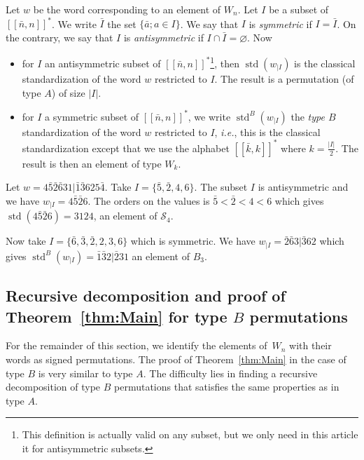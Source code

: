 \documentclass[Unicode]{cedram-alco}
\theoremstyle{definition}
\newcommand{\Sym}[1]{\mathcal{S}_{#1}}
\DeclareMathOperator{\std}{std}
\newcommand{\rest}[2]{#1_{|#2}}
\newcommand{\Bsetnn}{[\![\bar{n},n ]\!]^*}
\newcommand{\Bsetkk}{[\![\bar{k},k ]\!]^*}
\newcommand{\Bstd}{\std^{B}}
\begin{document}
\begin{defi}\label{def:Standard}
Let $w$ be the word corresponding to an element of $W_n$. Let $I$ be a subset of $\Bsetnn$. We write $\bar{I}$ the set $\lbrace \bar a; a \in I \rbrace$. We say that $I$ is \emph{symmetric} if $I = \bar{I}$. On the contrary, we say that $I$ is {\em antisymmetric} if $I \cap \bar{I} = \varnothing$. Now
\begin{itemize}
\item for $I$ an antisymmetric subset of $\Bsetnn$\footnote{This definition is actually valid on any subset, but we only need in this article  it for antisymmetric subsets.}, then $\std(\rest{w}{I})$ is the classical standardization of the word $w$ restricted to $I$. The result is a permutation (of type $A$) of size $|I|$.
\item for $I$ a symmetric subset of $\Bsetnn$, we write $\Bstd(\rest{w}{I})$ the \emph{type $B$} standardization of the word $w$ restricted to $I$, \emph{i.e.}, this is the classical standardization except that we use the alphabet $\Bsetkk$ where $k = \frac{|I|}{2}$. The result is then an element of type $W_k$.
\end{itemize}
\end{defi}

\begin{ex}
\label{ex:restrition}
Let $w = 4 \bar{5} \bar{2} \bar{6} 3 1 | \bar{1} \bar{3} 6 2 5 \bar{4}$. Take $I = \lbrace \bar{5}, \bar{2}, 4, 6 \rbrace$. The subset $I$ is antisymmetric and we have $\rest{w}{I} = 4 \bar{5} \bar{2} 6$. The orders on the values is $\bar{5} < \bar{2} < 4 < 6$ which gives $\std(4 \bar{5} \bar{2} 6) = 3 1 2 4$, an element of $\Sym{4}$.

Now take $I = \lbrace \bar{6}, \bar{3}, \bar{2}, 2, 3, 6 \rbrace$ which is symmetric. We have $\rest{w}{I} = \bar{2} \bar{6} 3 | \bar{3} 6 2$ which gives $\Bstd(\rest{w}{I}) = \bar{1} \bar{3} 2 | \bar{2} 3 1$ an element of $B_3$. 
\end{ex}


\subsection{Recursive decomposition and proof of Theorem~\ref{thm:Main} for type \texorpdfstring{$B$}{B} permutations} For the remainder of this section, we identify the elements of~$W_n$ with their words as signed permutations.  The proof of Theorem~\ref{thm:Main} in the case of type $B$ is very similar to type $A$. The difficulty lies in finding a recursive decomposition of type $B$ permutations that satisfies the same properties as in type $A$.
\end{document}
